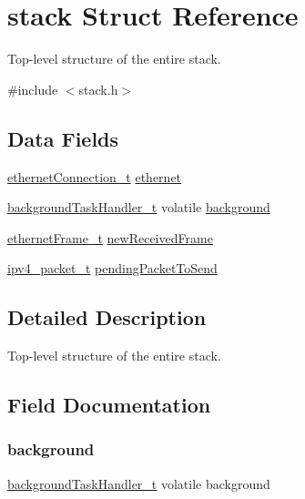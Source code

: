 \hypertarget{structstack}{}\section{stack Struct Reference}
\label{structstack}


Top-\/level structure of the entire stack.  




{\ttfamily \#include $<$stack.\+h$>$}

\subsection*{Data Fields}
\begin{DoxyCompactItemize}
\item 
\mbox{\hyperlink{group__ethernet_gae7b6008a02816680c2e3a1e3d2451a60}{ethernet\+Connection\+\_\+t}} \mbox{\hyperlink{structstack_ad531e518750e328d180181dad48b5a47}{ethernet}}
\item 
\mbox{\hyperlink{group__background_gac2e383293fae75d74beedf63afefe604}{background\+Task\+Handler\+\_\+t}} volatile \mbox{\hyperlink{structstack_ae944679bccff9c73f33357fb18c1dec3}{background}}
\item 
\mbox{\hyperlink{group__ethernet_ga7519a7ae14b490659069435698d28a25}{ethernet\+Frame\+\_\+t}} \mbox{\hyperlink{structstack_adb9d89701c6708cac78a4c6373c307e6}{new\+Received\+Frame}}
\item 
\mbox{\hyperlink{group__ipv4_ga68ea36d252d9332fd5e37d9aaedd06af}{ipv4\+\_\+packet\+\_\+t}} \mbox{\hyperlink{structstack_add38392b782a601d965c4f3cdca4617f}{pending\+Packet\+To\+Send}}
\end{DoxyCompactItemize}


\subsection{Detailed Description}
Top-\/level structure of the entire stack. 

\subsection{Field Documentation}
\mbox{\label{structstack_ae944679bccff9c73f33357fb18c1dec3}} 
\subsubsection{\texorpdfstring{background}{background}}
{\footnotesize\ttfamily \mbox{\hyperlink{group__background_gac2e383293fae75d74beedf63afefe604}{background\+Task\+Handler\+\_\+t}} volatile background}

